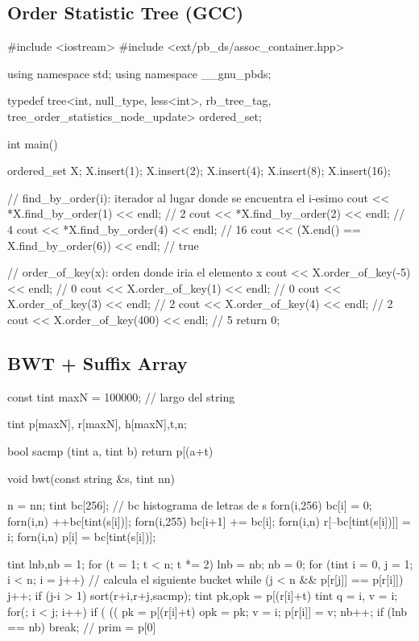 \subsection{Order Statistic Tree (GCC)}
\begin{code}
#include <iostream>
#include <ext/pb_ds/assoc_container.hpp>

using namespace std;
using namespace __gnu_pbds;

typedef tree<int, null_type, less<int>, rb_tree_tag, 
tree_order_statistics_node_update> ordered_set;

int main() {
  ordered_set X;
  X.insert(1); X.insert(2); X.insert(4); X.insert(8); X.insert(16);

  // find_by_order(i): iterador al lugar donde se encuentra el i-esimo
  cout << *X.find_by_order(1) << endl; // 2
  cout << *X.find_by_order(2) << endl; // 4
  cout << *X.find_by_order(4) << endl; // 16
  cout << (X.end() == X.find_by_order(6)) << endl; // true

  // order_of_key(x): orden donde iria el elemento x
  cout << X.order_of_key(-5) << endl;  // 0
  cout << X.order_of_key(1) << endl;   // 0
  cout << X.order_of_key(3) << endl;   // 2
  cout << X.order_of_key(4) << endl;   // 2
  cout << X.order_of_key(400) << endl; // 5
  return 0;
}
\end{code}

\subsection{BWT + Suffix Array}

\begin{code}
const tint maxN = 100000; // largo del string

tint p[maxN], r[maxN], h[maxN],t,n;

bool sacmp (tint a, tint b)
{
	return p[(a+t)%
}

void bwt(const string &s, tint nn)
{
	n = nn;
	tint bc[256]; // bc histograma de letras de s
	forn(i,256)
	bc[i] = 0;
	forn(i,n)
	++bc[tint(s[i])];
	forn(i,255)
	bc[i+1] += bc[i];
	forn(i,n)
	r[--bc[tint(s[i])]] = i;
	forn(i,n)
	p[i] = bc[tint(s[i])];
	
	tint lnb,nb = 1;
	for (t = 1; t < n; t *= 2)
	{
		lnb = nb;
		nb = 0;
		for (tint i = 0, j = 1; i < n; i = j++)
		{
			// calcula el siguiente bucket
			while (j < n && p[r[j]] == p[r[i]])
			j++;
			if (j-i > 1)
			{
				sort(r+i,r+j,sacmp);
				tint pk,opk = p[(r[i]+t)%
				tint q = i, v = i;
				for(; i < j; i++)
				{
					if ( (( pk = p[(r[i]+t)%
					{
						opk = pk;
						v = i;
					}
					p[r[i]] = v; 
				}
			}
			nb++;
		}
		if (lnb == nb)
		break;
	}
	// prim = p[0]
}
\end{code}

